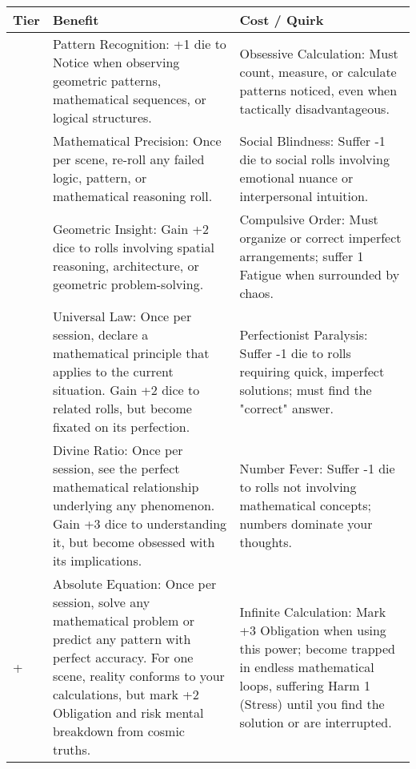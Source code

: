 \begin{longtable}{>{\raggedright\arraybackslash}p{1cm} p{5cm} p{5cm}}
\toprule
\textbf{Tier} & \textbf{Benefit} & \textbf{Cost / Quirk} \\
\midrule
1 & Pattern Recognition: +1 die to Notice when observing geometric patterns, mathematical sequences, or logical structures. & Obsessive Calculation: Must count, measure, or calculate patterns noticed, even when tactically disadvantageous. \\
\midrule
2 & Mathematical Precision: Once per scene, re-roll any failed logic, pattern, or mathematical reasoning roll. & Social Blindness: Suffer -1 die to social rolls involving emotional nuance or interpersonal intuition. \\
\midrule
3 & Geometric Insight: Gain +2 dice to rolls involving spatial reasoning, architecture, or geometric problem-solving. & Compulsive Order: Must organize or correct imperfect arrangements; suffer 1 Fatigue when surrounded by chaos. \\
\midrule
4 & Universal Law: Once per session, declare a mathematical principle that applies to the current situation. Gain +2 dice to related rolls, but become fixated on its perfection. & Perfectionist Paralysis: Suffer -1 die to rolls requiring quick, imperfect solutions; must find the "correct" answer. \\
\midrule
5 & Divine Ratio: Once per session, see the perfect mathematical relationship underlying any phenomenon. Gain +3 dice to understanding it, but become obsessed with its implications. & Number Fever: Suffer -1 die to rolls not involving mathematical concepts; numbers dominate your thoughts. \\
\midrule
6+ & Absolute Equation: Once per session, solve any mathematical problem or predict any pattern with perfect accuracy. For one scene, reality conforms to your calculations, but mark +2 Obligation and risk mental breakdown from cosmic truths. & Infinite Calculation: Mark +3 Obligation when using this power; become trapped in endless mathematical loops, suffering Harm 1 (Stress) until you find the solution or are interrupted. \\
\bottomrule
\end{longtable}